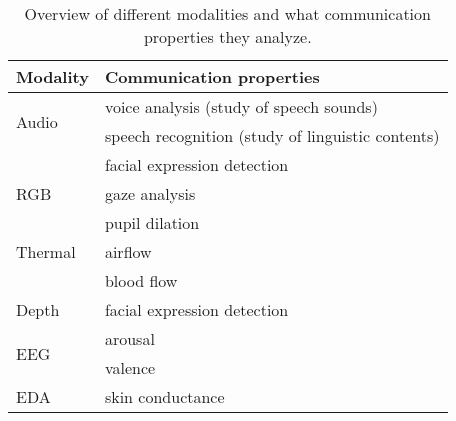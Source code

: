 \begin{table}
\centering
\caption{Overview of different modalities and what communication properties they analyze.}
\label{tab:modality}
\begin{tabular}{l|l}
\toprule
\textbf{Modality}      & \textbf{Communication properties}                 \\ \midrule
\multirow{2}{*}{Audio} & voice analysis (study of speech sounds)           \\
                       & speech recognition (study of linguistic contents) \\ \midrule
\multirow{3}{*}{RGB}   & facial expression detection                       \\
                       & gaze analysis                                     \\
                       & pupil dilation                                    \\ \midrule
Thermal                & airflow                                           \\
                       & blood flow                                        \\ \midrule
Depth                  & facial expression detection                       \\ \midrule
\multirow{2}{*}{EEG}   & arousal                                           \\
                       & valence                                           \\ \midrule
EDA                    & skin conductance                                 
\end{tabular}
\end{table}

















